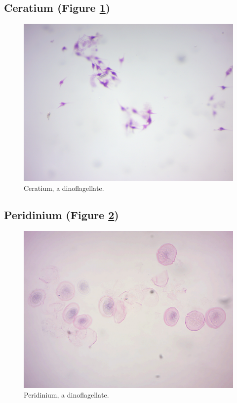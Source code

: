 \subsection{Ceratium (Figure
\ref{fig:ceratium})}\label{ceratium-figure-reffigceratium}

\begin{figure}

{\centering \includegraphics[width=0.7\linewidth]{./figures/protists/ceratium} 

}

\caption{Ceratium, a dinoflagellate.}\label{fig:ceratium}
\end{figure}

\subsection{Peridinium (Figure
\ref{fig:peridinium})}\label{peridinium-figure-reffigperidinium}

\begin{figure}

{\centering \includegraphics[width=0.7\linewidth]{./figures/protists/Peridinium} 

}

\caption{Peridinium, a dinoflagellate.}\label{fig:peridinium}
\end{figure}

